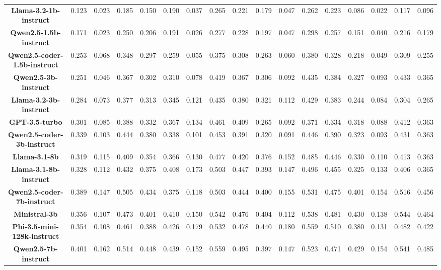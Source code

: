 \begin{table*}[t]
{\begin{tabular}{ccccccccccccccccc}
\textbf{Llama-3.2-1b-instruct} & 0.123 & 0.023 & 0.185 & 0.150 & 0.190 & 0.037 & 0.265 & 0.221 & 0.179 & 0.047 & 0.262 & 0.223 & 0.086 & 0.022 & 0.117 & 0.096 \\
\textbf{Qwen2.5-1.5b-instruct} & 0.171 & 0.023 & 0.250 & 0.206 & 0.191 & 0.026 & 0.277 & 0.228 & 0.197 & 0.047 & 0.298 & 0.257 & 0.151 & 0.040 & 0.216 & 0.179 \\
\textbf{Qwen2.5-coder-1.5b-instruct} & 0.253 & 0.068 & 0.348 & 0.297 & 0.259 & 0.055 & 0.375 & 0.308 & 0.263 & 0.060 & 0.380 & 0.328 & 0.218 & 0.049 & 0.309 & 0.255 \\
\textbf{Qwen2.5-3b-instruct} & 0.251 & 0.046 & 0.367 & 0.302 & 0.310 & 0.078 & 0.419 & 0.367 & 0.306 & 0.092 & 0.435 & 0.384 & 0.327 & 0.093 & 0.433 & 0.365 \\
\textbf{Llama-3.2-3b-instruct} & 0.284 & 0.073 & 0.377 & 0.313 & 0.345 & 0.121 & 0.435 & 0.380 & 0.321 & 0.112 & 0.429 & 0.383 & 0.244 & 0.084 & 0.304 & 0.265 \\
\textbf{GPT-3.5-turbo} & 0.301 & 0.085 & 0.388 & 0.332 & 0.367 & 0.134 & 0.461 & 0.409 & 0.265 & 0.092 & 0.371 & 0.334 & 0.318 & 0.088 & 0.412 & 0.363 \\
\textbf{Qwen2.5-coder-3b-instruct} & 0.339 & 0.103 & 0.444 & 0.380 & 0.338 & 0.101 & 0.453 & 0.391 & 0.320 & 0.091 & 0.446 & 0.390 & 0.323 & 0.093 & 0.431 & 0.363 \\
\textbf{Llama-3.1-8b} & 0.319 & 0.115 & 0.409 & 0.354 & 0.366 & 0.130 & 0.477 & 0.420 & 0.376 & 0.152 & 0.485 & 0.446 & 0.330 & 0.110 & 0.413 & 0.363 \\
\textbf{Llama-3.1-8b-instruct} & 0.328 & 0.112 & 0.432 & 0.375 & 0.408 & 0.173 & 0.503 & 0.447 & 0.393 & 0.147 & 0.496 & 0.455 & 0.325 & 0.133 & 0.406 & 0.365 \\
\textbf{Qwen2.5-coder-7b-instruct} & 0.389 & 0.147 & 0.505 & 0.434 & 0.375 & 0.118 & 0.503 & 0.444 & 0.400 & 0.155 & 0.531 & 0.475 & 0.401 & 0.154 & 0.516 & 0.456 \\
\textbf{Ministral-3b} & 0.356 & 0.107 & 0.473 & 0.401 & 0.410 & 0.150 & 0.542 & 0.476 & 0.404 & 0.112 & 0.538 & 0.481 & 0.430 & 0.138 & 0.544 & 0.464 \\
\textbf{Phi-3.5-mini-128k-instruct} & 0.354 & 0.108 & 0.461 & 0.388 & 0.426 & 0.179 & 0.532 & 0.478 & 0.440 & 0.180 & 0.559 & 0.510 & 0.380 & 0.131 & 0.482 & 0.422 \\
\textbf{Qwen2.5-7b-instruct} & 0.401 & 0.162 & 0.514 & 0.448 & 0.439 & 0.152 & 0.559 & 0.495 & 0.397 & 0.147 & 0.523 & 0.471 & 0.429 & 0.154 & 0.541 & 0.485 \\

\end{tabular}}
\end{table*}

